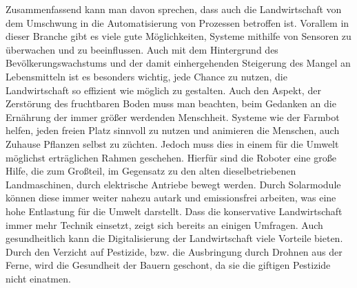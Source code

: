 Zusammenfassend kann man davon sprechen, dass auch die Landwirtschaft von dem
Umschwung in die Automatisierung von Prozessen betroffen ist. Vorallem in
dieser Branche gibt es viele gute Möglichkeiten, Systeme mithilfe von Sensoren
zu überwachen und zu beeinflussen. Auch mit dem Hintergrund des
Bevölkerungswachstums und der damit einhergehenden Steigerung des Mangel an
Lebensmitteln ist es besonders wichtig, jede Chance zu nutzen, die
Landwirtschaft so effizient wie möglich zu gestalten. Auch den Aspekt, der
Zerstörung des fruchtbaren Boden muss man beachten, beim Gedanken an die
Ernährung der immer größer werdenden Menschheit.\cite{rainer2003diskurs} Systeme
wie der Farmbot helfen, jeden freien Platz sinnvoll zu nutzen und animieren die
Menschen, auch Zuhause Pflanzen selbst zu züchten. Jedoch muss dies in einem
für die Umwelt möglichst erträglichen Rahmen geschehen. Hierfür sind die
Roboter eine große Hilfe, die zum Großteil, im Gegensatz zu den alten
dieselbetriebenen Landmaschinen, durch elektrische Antriebe bewegt werden.
Durch Solarmodule können diese immer weiter nahezu autark und emissionsfrei
arbeiten, was eine hohe Entlastung für die Umwelt darstellt. Dass die
konservative Landwirtschaft immer mehr Technik einsetzt, zeigt sich bereits an
einigen Umfragen.
Auch gesundheitlich kann die Digitalisierung der Landwirtschaft viele Vorteile bieten. Durch den Verzicht auf Pestizide, bzw. die Ausbringung durch Drohnen aus der Ferne, wird die Gesundheit der Bauern geschont, da sie die giftigen Pestizide nicht einatmen. \cite{jungwirth2022arbeitszeitbedarf}
